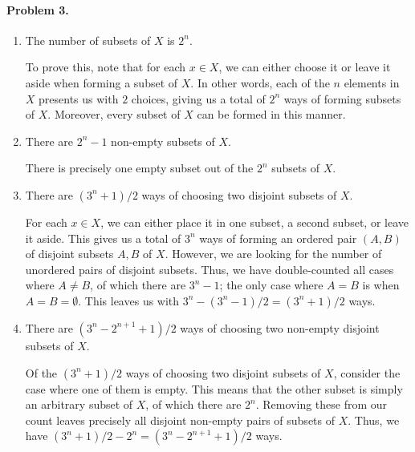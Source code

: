 \documentclass[10pt]{article}
\begin{document}
    \clearpage
    \paragraph{Problem 3.}
    \begin{enumerate}
        \item The number of subsets of $X$ is $2^n$.

        To prove this, note that for each $x \in X$, we can either choose it
        or leave it aside when forming a subset of $X$. In other words, each
        of the $n$ elements in $X$ presents us with $2$ choices, giving us a
        total of $2^n$ ways of forming subsets of $X$. Moreover, every subset
        of $X$ can be formed in this manner.


        \item There are $2^n - 1$ non-empty subsets of $X$.

        There is precisely one empty subset out of the $2^n$ subsets of $X$.


        \item There are $(3^n + 1) / 2$ ways of choosing two disjoint subsets
        of $X$.

        For each $x \in X$, we can either place it in one subset, a second
        subset, or leave it aside. This gives us a total of $3^n$ ways of
        forming an ordered pair $(A, B)$ of disjoint subsets $A, B$ of $X$.
        However, we are looking for the number of unordered pairs of disjoint
        subsets. Thus, we have double-counted all cases where $A \neq B$, of
        which there are $3^n - 1$; the only case where $A = B$ is when $A = B
        = \emptyset$. This leaves us with $3^n - (3^n - 1) / 2 = (3^n + 1) /
        2$ ways.


        \item There are $(3^n - 2^{n + 1} + 1) / 2$ ways of choosing two
        non-empty disjoint subsets of $X$.

        Of the $(3^n + 1) / 2$ ways of choosing two disjoint subsets of $X$,
        consider the case where one of them is empty. This means that the
        other subset is simply an arbitrary subset of $X$, of which there are
        $2^n$. Removing these from our count leaves precisely all disjoint
        non-empty pairs of subsets of $X$. Thus, we have $(3^n + 1) / 2 - 2^n
        = (3^n - 2^{n + 1} + 1) / 2$ ways.
    \end{enumerate}
\end{document}
